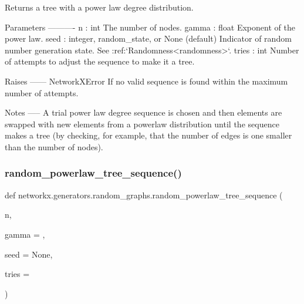 \begin{DoxyVerb}Returns a tree with a power law degree distribution.

Parameters
----------
n : int
    The number of nodes.
gamma : float
    Exponent of the power law.
seed : integer, random_state, or None (default)
    Indicator of random number generation state.
    See :ref:`Randomness<randomness>`.
tries : int
    Number of attempts to adjust the sequence to make it a tree.

Raises
------
NetworkXError
    If no valid sequence is found within the maximum number of
    attempts.

Notes
-----
A trial power law degree sequence is chosen and then elements are
swapped with new elements from a powerlaw distribution until the
sequence makes a tree (by checking, for example, that the number of
edges is one smaller than the number of nodes).\end{DoxyVerb}
 \mbox{\label{namespacenetworkx_1_1generators_1_1random__graphs_a3bf437659d4f4f71b23f22b6bd701a73}} 
\subsubsection{\texorpdfstring{random\+\_\+powerlaw\+\_\+tree\+\_\+sequence()}{random\_powerlaw\_tree\_sequence()}}
{\footnotesize\ttfamily def networkx.\+generators.\+random\+\_\+graphs.\+random\+\_\+powerlaw\+\_\+tree\+\_\+sequence (\begin{DoxyParamCaption}\item[{}]{n,  }\item[{}]{gamma = {},  }\item[{}]{seed = {\ttfamily None},  }\item[{}]{tries = {} }\end{DoxyParamCaption})}

